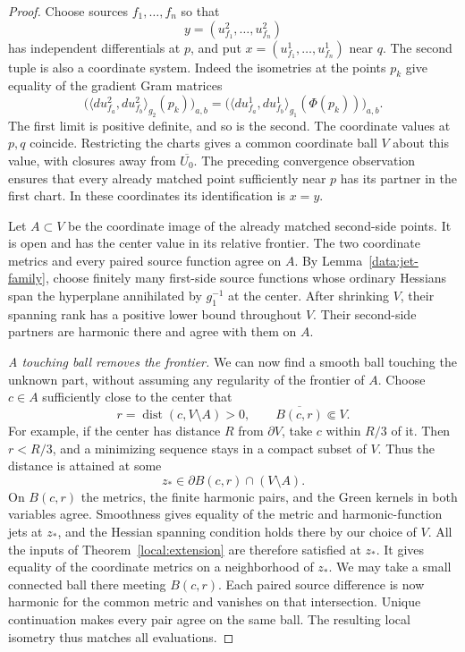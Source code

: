\documentclass[11pt]{article}
\theoremstyle{definition}
\theoremstyle{remark}
\DeclareMathOperator{\dist}{dist}
\numberwithin{equation}{section}
\begin{document}
\begin{proof}
Choose sources $f_1,\ldots,f_n$ so that
\[
 y=(u_{f_1}^2,\ldots,u_{f_n}^2)
\]
has independent differentials at $p$, and put
$x=(u_{f_1}^1,\ldots,u_{f_n}^1)$ near $q$.
The second tuple is also a coordinate system. Indeed the isometries
at the points $p_k$ give equality of the gradient Gram matrices
\[
 \bigl(\langle du_{f_a}^2,du_{f_b}^2\rangle_{g_2}(p_k)\bigr)_{a,b}
 =
 \bigl(\langle du_{f_a}^1,du_{f_b}^1\rangle_{g_1}(\Phi(p_k))\bigr)_{a,b}.
\]
The first limit is positive definite, and so is the second.
The coordinate values at $p,q$ coincide. Restricting the charts
gives a common coordinate ball $V$ about this value, with closures
away from $\overline{U_0}$. The preceding convergence observation
ensures that every already matched point sufficiently near $p$
has its partner in the first chart. In these coordinates its
identification is $x=y$.

Let $A\subset V$ be the coordinate image of the already matched
second-side points. It is open and has the center value in its
relative frontier. The two coordinate metrics and every paired
source function agree on $A$. By Lemma~\ref{data:jet-family},
choose finitely many first-side source functions whose ordinary
Hessians span the hyperplane annihilated by $g_1^{-1}$ at the
center. After shrinking $V$, their spanning rank has a positive
lower bound throughout $V$. Their second-side partners are
harmonic there and agree with them on $A$.

\emph{A touching ball removes the frontier.}\quad
We can now find a smooth ball touching the unknown part, without
assuming any regularity of the frontier of $A$. Choose $c\in A$
sufficiently close to the center that
\[
 r=\dist(c,V\setminus A)>0,\qquad
 \overline{B(c,r)}\Subset V.
\]
For example, if the center has distance $R$ from $\partial V$,
take $c$ within $R/3$ of it. Then $r<R/3$, and a minimizing
sequence stays in a compact subset of $V$. Thus the distance is
attained at some
\[
 z_*\in\partial B(c,r)\cap(V\setminus A).
\]
On $B(c,r)$ the metrics, the finite harmonic pairs, and the Green
kernels in both variables agree. Smoothness gives equality of
the metric and harmonic-function jets at $z_*$, and the Hessian spanning
condition holds there by our choice of $V$. All the inputs of
Theorem~\ref{local:extension} are therefore satisfied at $z_*$.
It gives equality of the coordinate metrics on a neighborhood of
$z_*$. We may take a small connected ball there meeting $B(c,r)$.
Each paired source difference is now harmonic for the common
metric and vanishes on that intersection. Unique continuation
makes every pair agree on the same ball. The resulting local
isometry thus matches all evaluations.


\end{proof}
\end{document}
